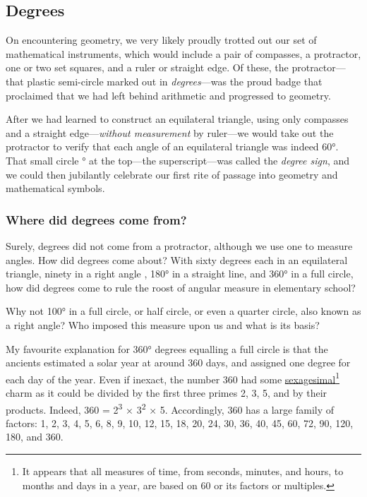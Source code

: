 \documentclass[
  a4paper,
]{article}
\begin{document}
\hypertarget{degrees}{%
\subsection{Degrees}\label{degrees}}

On encountering geometry, we very likely proudly trotted out our set of
mathematical instruments, which would include a pair of compasses, a
protractor, one or two set squares, and a ruler or straight edge. Of
these, the protractor---that plastic semi-circle marked out in
\emph{degrees}---was the proud badge that proclaimed that we had left
behind arithmetic and progressed to geometry.

After we had learned to construct an equilateral triangle, using only
compasses and a straight edge---\emph{without measurement} by ruler---we
would take out the protractor to verify that each angle of an
equilateral triangle was indeed 60°. That small circle ° at the
top---the superscript---was called the \emph{degree sign}, and we could
then jubilantly celebrate our first rite of passage into geometry and
mathematical symbols.

\hypertarget{where-did-degrees-come-from}{%
\subsubsection{Where did degrees come
from?}\label{where-did-degrees-come-from}}

Surely, degrees did not come from a protractor, although we use one to
measure angles. How did degrees come about? With sixty degrees each in
an equilateral triangle, ninety in a right angle , 180° in a straight
line, and 360° in a full circle, how did degrees come to rule the roost
of angular measure in elementary school?

Why not 100° in a full circle, or half circle, or even a quarter circle,
also known as a right angle? Who imposed this measure upon us and what
is its basis?

My favourite explanation for 360° degrees equalling a full circle is
that the ancients estimated a solar year at around 360 days, and
assigned one degree for each day of the year. Even if inexact, the
number 360 had some
\href{https://en.wikipedia.org/wiki/Sexagesimal}{sexagesimal}\footnote{It
  appears that all measures of time, from seconds, minutes, and hours,
  to months and days in a year, are based on 60 or its factors or
  multiples.} charm as it could be divided by the first three primes 2,
3, 5, and by their products. Indeed, 360 = 2\textsuperscript{3} ×
3\textsuperscript{2} × 5. Accordingly, 360 has a large family of
factors: 1, 2, 3, 4, 5, 6, 8, 9, 10, 12, 15, 18, 20, 24, 30, 36, 40, 45,
60, 72, 90, 120, 180, and 360.
\end{document}
